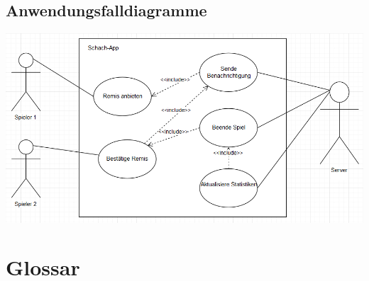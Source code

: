 \documentclass[parskip=full]{scrartcl}
\begin{document}
\begin{enumerate}
\subsection{Anwendungsfalldiagramme} 
		\begin{minipage}{\linewidth}
			\centering
			\includegraphics[width=1\linewidth]{Remis}
			\label{fig:remis}
		\end{minipage}
\end{enumerate}
\section{Glossar}
\printglossaries
\end{document}
